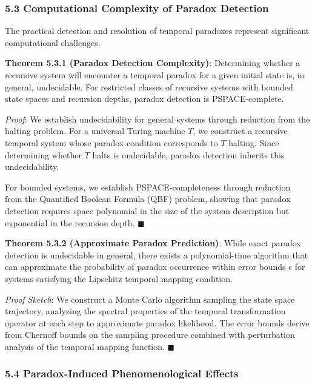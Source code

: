 \documentclass[
]{article}
\begin{document}
\subsubsection{5.3 Computational Complexity of Paradox
Detection}\label{computational-complexity-of-paradox-detection}

The practical detection and resolution of temporal paradoxes represent
significant computational challenges.

\textbf{Theorem 5.3.1 (Paradox Detection Complexity)}: Determining
whether a recursive system will encounter a temporal paradox for a given
initial state is, in general, undecidable. For restricted classes of
recursive systems with bounded state spaces and recursion depths,
paradox detection is PSPACE-complete.

\emph{Proof}: We establish undecidability for general systems through
reduction from the halting problem. For a universal Turing machine
\(T\), we construct a recursive temporal system whose paradox condition
corresponds to \(T\) halting. Since determining whether \(T\) halts is
undecidable, paradox detection inherits this undecidability.

For bounded systems, we establish PSPACE-completeness through reduction
from the Quantified Boolean Formula (QBF) problem, showing that paradox
detection requires space polynomial in the size of the system
description but exponential in the recursion depth. \(\blacksquare \)

\textbf{Theorem 5.3.2 (Approximate Paradox Prediction)}: While exact
paradox detection is undecidable in general, there exists a
polynomial-time algorithm that can approximate the probability of
paradox occurrence within error bounds \(\epsilon\) for systems
satisfying the Lipschitz temporal mapping condition.

\emph{Proof Sketch}: We construct a Monte Carlo algorithm sampling the
state space trajectory, analyzing the spectral properties of the
temporal transformation operator at each step to approximate paradox
likelihood. The error bounds derive from Chernoff bounds on the sampling
procedure combined with perturbation analysis of the temporal mapping
function. \(\blacksquare \)

\subsubsection{5.4 Paradox-Induced Phenomenological
Effects}\label{paradox-induced-phenomenological-effects}
\end{document}
